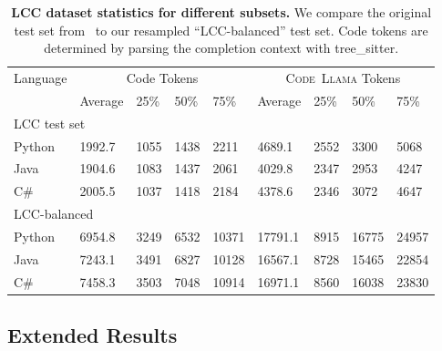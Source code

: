 \documentclass[10pt]{article}
\newcommand{\model}{\textsc{Code~Llama}\xspace}
\begin{document}
\begin{table}[]
\centering
\begin{tabular}{lllllllll}
\toprule
Language & \multicolumn{4}{c}{Code Tokens} & \multicolumn{4}{c}{\model Tokens} \\
& Average & 25\% & 50\% & 75\% & Average & 25\% & 50\% & 75\% \\
\midrule
\multicolumn{9}{l}{LCC test set} \\
\midrule
Python & 1992.7 & 1055 & 1438 & 2211 & 4689.1 & 2552 & 3300 & 5068 \\
Java & 1904.6 & 1083 & 1437 & 2061 & 4029.8 & 2347 & 2953 & 4247 \\
C\# & 2005.5 & 1037 & 1418 & 2184 & 4378.6 & 2346 & 3072 & 4647  \\
\midrule
\multicolumn{9}{l}{LCC-balanced} \\
\midrule
Python & 6954.8 & 3249 & 6532 & 10371 & 17791.1 & 8915 & 16775 & 24957 \\
Java & 7243.1 & 3491 & 6827 & 10128 & 16567.1 & 8728 & 15465 & 22854\\
C\# & 7458.3 & 3503 & 7048 & 10914 & 16971.1 & 8560 & 16038 & 23830 \\
\bottomrule
\end{tabular}
\caption{\textbf{LCC dataset statistics for different subsets.} We compare the original test set from~\citep{guo2023longcoder} to our resampled ``LCC-balanced'' test set. Code tokens are determined by parsing the completion context with tree\_sitter.}
\label{tab:lcc_balanced_stats}
\end{table}


\subsection{Extended Results}
\label{app:lcft_extended_results}
\end{document}
